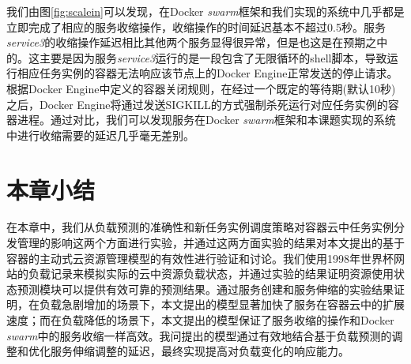 我们由图\ref{fig:scalein}可以发现，在Docker \emph{swarm}框架和我们实现的系统中几乎都是立即完成了相应的服务收缩操作，收缩操作的时间延迟基本不超过0.5秒。服务\emph{service3}的收缩操作延迟相比其他两个服务显得很异常，但是也这是在预期之中的。这主要是因为服务\emph{service3}运行的是一段包含了无限循环的shell脚本，导致运行相应任务实例的容器无法响应该节点上的Docker Engine正常发送的停止请求。根据Docker Engine中定义的容器关闭规则，在经过一个既定的等待期(默认10秒)之后，Docker Engine将通过发送SIGKILL的方式强制杀死运行对应任务实例的容器进程。通过对比，我们可以发现服务在Docker \emph{swarm}框架和本课题实现的系统中进行收缩需要的延迟几乎毫无差别。

\section{本章小结}
在本章中，我们从负载预测的准确性和新任务实例调度策略对容器云中任务实例分发管理的影响这两个方面进行实验，并通过这两方面实验的结果对本文提出的基于容器的主动式云资源管理模型的有效性进行验证和讨论。我们使用1998年世界杯网站的负载记录来模拟实际的云中资源负载状态，并通过实验的结果证明资源使用状态预测模块可以提供有效可靠的预测结果。通过服务创建和服务伸缩的实验结果证明，在负载急剧增加的场景下，本文提出的模型显著加快了服务在容器云中的扩展速度；而在负载降低的场景下，本文提出的模型保证了服务收缩的操作和Docker \emph{swarm}中的服务收缩一样高效。我问提出的模型通过有效地结合基于负载预测的调整和优化服务伸缩调整的延迟，最终实现提高对负载变化的响应能力。
